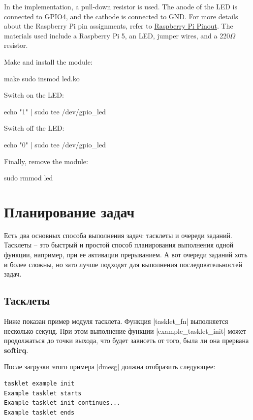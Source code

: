 \documentclass[10pt, oneside]{book}
\begin{document}
In the implementation, a pull-down resistor is used.
The anode of the LED is connected to GPIO4, and the cathode is connected to GND.
For more details about the Raspberry Pi pin assignments, refer to \href{https://pinout.xyz/}{Raspberry Pi Pinout}.
The materials used include a Raspberry Pi 5, an LED, jumper wires, and a 220$\Omega$ resistor.


Make and install the module:
\begin{codebash}
make
sudo insmod led.ko
\end{codebash}

Switch on the LED:
\begin{codebash}
echo "1" | sudo tee /dev/gpio_led
\end{codebash}

Switch off the LED:
\begin{codebash}
echo "0" | sudo tee /dev/gpio_led
\end{codebash}

Finally, remove the module:
\begin{codebash}
sudo rmmod led
\end{codebash}

\section{Планирование задач}
\label{sec:scheduling_tasks}
Есть два основных способа выполнения задач: тасклеты и очереди заданий. Тасклеты – это быстрый и простой способ планирования выполнения одной функции, например, при ее активации прерыванием.
А вот очереди заданий хоть и более сложны, но зато лучше подходят для выполнения последовательностей задач.

\subsection{Тасклеты}
\label{sec:tasklet}
Ниже показан пример модуля тасклета. Функция \cpp|tasklet_fn| выполняется несколько секунд. При этом выполнение функции \cpp|example_tasklet_init| может продолжаться до точки выхода, что будет зависеть от того, была ли она прервана \textbf{softirq}.


После загрузки этого примера \sh|dmesg| должна отобразить следующее:

\begin{verbatim}
tasklet example init
Example tasklet starts
Example tasklet init continues...
Example tasklet ends
\end{verbatim}
\end{document}
